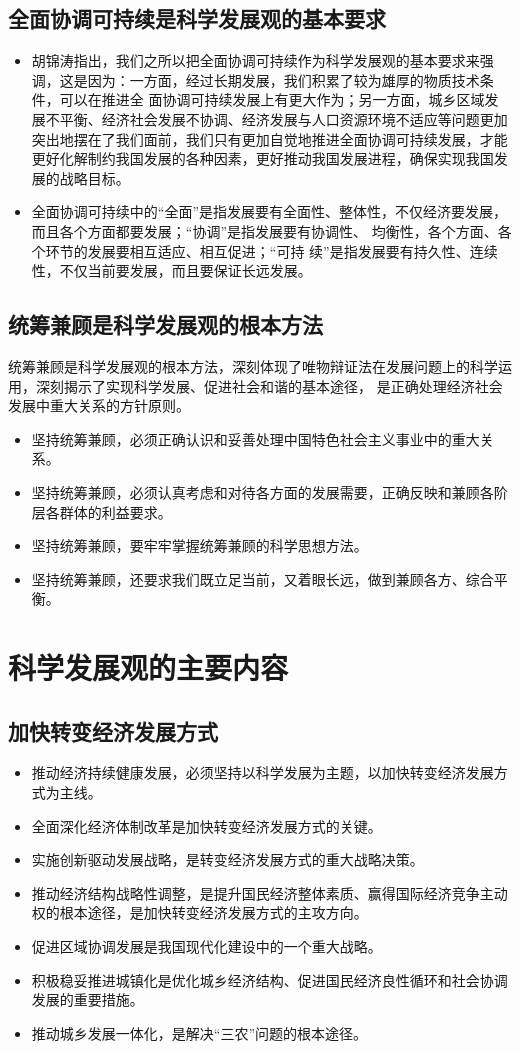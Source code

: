 \documentclass[12pt,openany]{ctexbook}
\begin{document}
\subsection{全面协调可持续是科学发展观的基本要求}
\begin{itemize}
  \item 胡锦涛指出，我们之所以把全面协调可持续作为科学发展观的基本要求来强调，这是因为：一方面，经过长期发展，我们积累了较为雄厚的物质技术条件，可以在推进全 面协调可持续发展上有更大作为；另一方面，城乡区域发展不平衡、经济社会发展不协调、经济发展与人口资源环境不适应等问题更加突出地摆在了我们面前，我们只有更加自觉地推进全面协调可持续发展，才能更好化解制约我国发展的各种因素，更好推动我国发展进程，确保实现我国发展的战略目标。
  \item 全面协调可持续中的“全面”是指发展要有全面性、整体性，不仅经济要发展，而且各个方面都要发展；“协调”是指发展要有协调性、 均衡性，各个方面、各个环节的发展要相互适应、相互促进；“可持 续”是指发展要有持久性、连续性，不仅当前要发展，而且要保证长远发展。
\end{itemize}
\subsection{统筹兼顾是科学发展观的根本方法}
统筹兼顾是科学发展观的根本方法，深刻体现了唯物辩证法在发展问题上的科学运用，深刻揭示了实现科学发展、促进社会和谐的基本途径， 是正确处理经济社会发展中重大关系的方针原则。
\begin{itemize}
  \item 坚持统筹兼顾，必须正确认识和妥善处理中国特色社会主义事业中的重大关系。
  \item 坚持统筹兼顾，必须认真考虑和对待各方面的发展需要，正确反映和兼顾各阶层各群体的利益要求。
  \item 坚持统筹兼顾，要牢牢掌握统筹兼顾的科学思想方法。
  \item 坚持统筹兼顾，还要求我们既立足当前，又着眼长远，做到兼顾各方、综合平衡。
\end{itemize}
\section{科学发展观的主要内容}
\subsection{加快转变经济发展方式}
\begin{itemize}
  \item 推动经济持续健康发展，必须坚持以科学发展为主题，以加快转变经济发展方式为主线。
  \item 全面深化经济体制改革是加快转变经济发展方式的关键。
  \item 实施创新驱动发展战略，是转变经济发展方式的重大战略决策。
  \item 推动经济结构战略性调整，是提升国民经济整体素质、赢得国际经济竞争主动权的根本途径，是加快转变经济发展方式的主攻方向。
  \item 促进区域协调发展是我国现代化建设中的一个重大战略。
  \item 积极稳妥推进城镇化是优化城乡经济结构、促进国民经济良性循环和社会协调发展的重要措施。
  \item 推动城乡发展一体化，是解决“三农”问题的根本途径。
\end{itemize}
\end{document}

